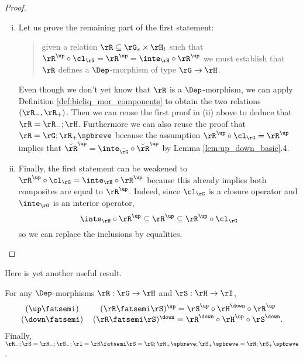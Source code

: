 \documentclass{article}
\begin{document}
\begin{proof}
\begin{enumerate}[i.]
  \item
  Let us prove the remaining part of the first statement:
  \begin{quote}
  given a relation $\rR \subseteq \rG_s \times \rH_t$ such that $\rR^\up \circ \cl_\rG = \rR^\up = \inte_\rH \circ \rR^\up$ we must establish that $\rR$ defines a $\Dep$-morphism of type $\rG \to \rH$.
  \end{quote}

   Even though we don't yet know that $\rR$ is a $\Dep$-morphism, we can apply Definition \ref{def:bicliq_mor_components} to obtain the two relations $(\rR_-,\rR_+)$. Then we can reuse the first proof in (ii) above to deduce that $\rR = \rR_- ; \rH$. Furthermore we can also reuse the proof that $\rR = \rG ; \rR_+\spbreve$ because the assumption $\rR^\up \circ \cl_\rG = \rR^\up$ implies that $\breve{\rR}^\up = \inte_{\breve{\rG}} \circ \breve{\rR}^\up$ by Lemma \ref{lem:up_down_basic}.4.
  
  \item
  Finally, the first statement can be weakened to $\rR^\up \circ \cl_\rG = \inte_\rH \circ \rR^\up$ because this already implies both composites are equal to $\rR^\up$. Indeed, since $\cl_\rG$ is a closure operator and $\inte_\rG$ is an interior operator,
  \[
  \inte_\rH \circ \rR^\up \subseteq \rR^\up \subseteq \rR^\up \circ \cl_\rG
  \]
  so we can replace the inclusions by equalities.
\end{enumerate}
\end{proof}

Here is yet another useful result.

\begin{lemma}
\label{lem:bicliq_func_comp}
For any $\Dep$-morphisms $\rR : \rG \to \rH$ and $\rS : \rH \to \rI$,
\[
\begin{tabular}{cc}
$(\up\fatsemi)$  & $(\rR \fatsemi \rS)^\up = \rS^\up \circ \rH^\down \circ \rR^\up$
\\
$(\down\fatsemi)$ & $(\rR \fatsemi \rS)^\down = \rR^\down \circ \rH^\up \circ \rS^\down$.
\end{tabular}
\]
Finally, $
\rR_- ; \rS 
= \rR_- ; \rS_- ; \rI 
= \rR \fatsemi \rS 
= \rG ; \rR_+\spbreve ; \rS_+\spbreve
= \rR ; \rS_+\spbreve 
$.
\end{lemma}
\end{document}
